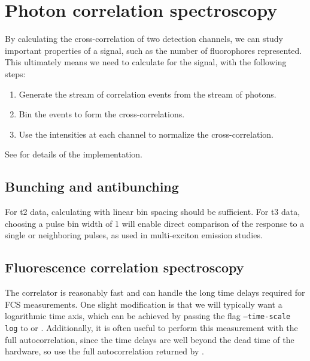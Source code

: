 \section{Photon correlation spectroscopy}
By calculating the cross-correlation of two detection channels, we can study important properties of a signal, such as the number of fluorophores represented. This ultimately means we need to calculate  for the signal, with the following steps:
\begin{enumerate}
\item Generate the stream of correlation events from the stream of photons.
\item Bin the events to form the cross-correlations.
\item Use the intensities at each channel to normalize the cross-correlation.
\end{enumerate}
See \GN{} for details of the implementation.

\subsection{Bunching and antibunching}
For t2 data, calculating  with linear bin spacing should be sufficient. For t3 data, choosing a pulse bin width of 1 will enable direct comparison of the response to a single or neighboring pulses, as used in multi-exciton emission studies.

\subsection{Fluorescence correlation spectroscopy}
The correlator is reasonably fast and can handle the long time delays required for FCS measurements. One slight modification is that we will typically want a logarithmic time axis, which can be achieved by passing the flag \texttt{--time-scale log} to \GN{} or . Additionally, it is often useful to perform this measurement with the full autocorrelation, since the time delays are well beyond the dead time of the hardware, so use the full autocorrelation returned by \GN.